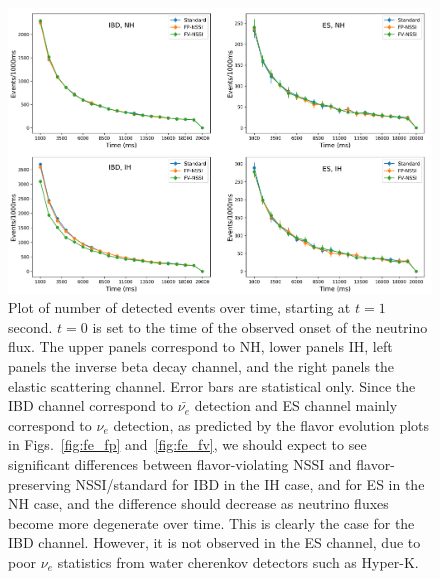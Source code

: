 \documentclass[a4paper,12pt]{article}
\begin{document}
\begin{figure}[h]
\begin{center}
\includegraphics[width=14cm]{detector_data.png}
\caption{Plot of number of detected events over time, starting at $t = 1$ second. $t = 0$ is set to the time of the observed onset of the neutrino flux. The upper panels correspond to NH, lower panels IH, left panels the inverse beta decay channel, and the right panels the elastic scattering channel. Error bars are statistical only. Since the IBD channel correspond to $\bar{\nu_{e}}$ detection and ES channel mainly correspond to $\nu_{e}$ detection, as predicted by the flavor evolution plots in Figs.~\ref{fig:fe_fp} and~\ref{fig:fe_fv}, we should expect to see significant differences between flavor-violating NSSI and flavor-preserving NSSI/standard for IBD in the IH case, and for ES in the NH case, and the difference should decrease as neutrino fluxes become more degenerate over time. This is clearly the case for the IBD channel. However, it is not observed in the ES channel, due to poor $\nu_{e}$ statistics from water cherenkov detectors such as Hyper-K.}
\label{fig:detector_data}
\end{center}
\end{figure}
\end{document}
